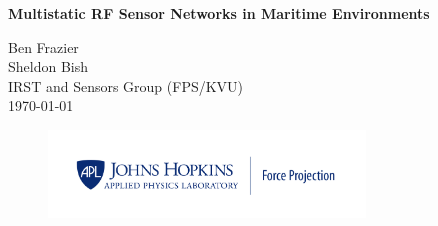 \titlepage
\thispagestyle{fancy}
\begin{center}
\vspace*{50pt}
{\huge \bfseries Multistatic RF Sensor Networks in Maritime Environments\\}
\vspace{75 pt}

\Large Ben Frazier \\
\Large Sheldon Bish \\
\large IRST and Sensors Group (FPS/KVU)\\
\vspace{25pt}
\large \today \\

\begin{figure}[!b]
\begin{center}
\includegraphics[width=0.75\textwidth]{../media/FP_Blue.png}
\end{center}
\end{figure}

\end{center}